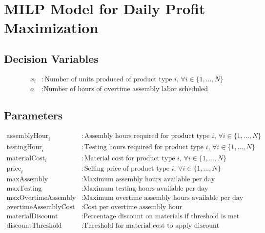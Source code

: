 \documentclass{article}
\begin{document}
\section*{MILP Model for Daily Profit Maximization}

\subsection*{Decision Variables}
\begin{align*}
    x_i & : \text{Number of units produced of product type } i, \, \forall i \in \{1, \ldots, N\} \\
    o & : \text{Number of hours of overtime assembly labor scheduled}
\end{align*}

\subsection*{Parameters}
\begin{align*}
    \text{assemblyHour}_i & : \text{Assembly hours required for product type } i, \, \forall i \in \{1, \ldots, N\} \\
    \text{testingHour}_i & : \text{Testing hours required for product type } i, \, \forall i \in \{1, \ldots, N\} \\
    \text{materialCost}_i & : \text{Material cost for product type } i, \, \forall i \in \{1, \ldots, N\} \\
    \text{price}_i & : \text{Selling price of product type } i, \, \forall i \in \{1, \ldots, N\} \\
    \text{maxAssembly} & : \text{Maximum assembly hours available per day} \\
    \text{maxTesting} & : \text{Maximum testing hours available per day} \\
    \text{maxOvertimeAssembly} & : \text{Maximum overtime assembly hours available per day} \\
    \text{overtimeAssemblyCost} & : \text{Cost per overtime assembly hour} \\
    \text{materialDiscount} & : \text{Percentage discount on materials if threshold is met} \\
    \text{discountThreshold} & : \text{Threshold for material cost to apply discount}
\end{align*}
\end{document}
